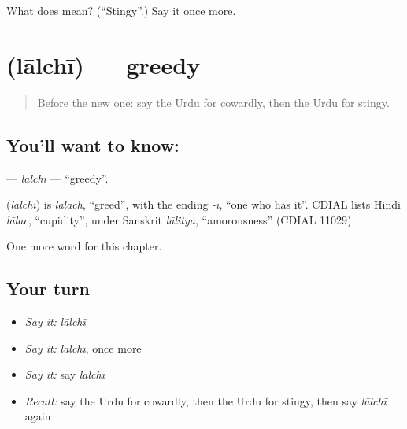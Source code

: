 \begin{tcolorbox}[breakable,colback=teal!4,colframe=teal!35!black,title={Before you move on}]
What does  mean? (\textquotedblleft{}Stingy\textquotedblright{}.) Say it once more.
\end{tcolorbox}
\section[\texorpdfstring{\ur{لالچی} (lālchī)}{لالچی (lālchī)}]{ (lālchī) — greedy}

\label{lesson:UR-C193-lalchi}



\begin{quote}
Before the new one: say the Urdu for cowardly, then the Urdu for stingy.
\end{quote}

\subsection*{You'll want to know: }
\textbf{} — \emph{lālchī} — \textquotedblleft{}greedy\textquotedblright{}.

\begin{cousinweb}
\textbf{} (\emph{lālchī}) is \emph{lālach}, \textquotedblleft{}greed\textquotedblright{}, with the ending \emph{-ī}, \textquotedblleft{}one who has it\textquotedblright{}. CDIAL lists Hindi \emph{lālac}, \textquotedblleft{}cupidity\textquotedblright{}, under Sanskrit \emph{lālitya}, \textquotedblleft{}amorousness\textquotedblright{} (CDIAL 11029).
\end{cousinweb}

\begin{grammarlens}[title={What you've built}]
One more word for this chapter.
\end{grammarlens}

\subsection*{Your turn}
\begin{itemize}
\raggedright
  \item \emph{Say it:} \emph{lālchī}
  \item \emph{Say it:} \emph{lālchī}, once more
  \item \emph{Say it:} say \emph{lālchī}
  \item \emph{Recall:} say the Urdu for cowardly, then the Urdu for stingy, then say \emph{lālchī} again
\end{itemize}

